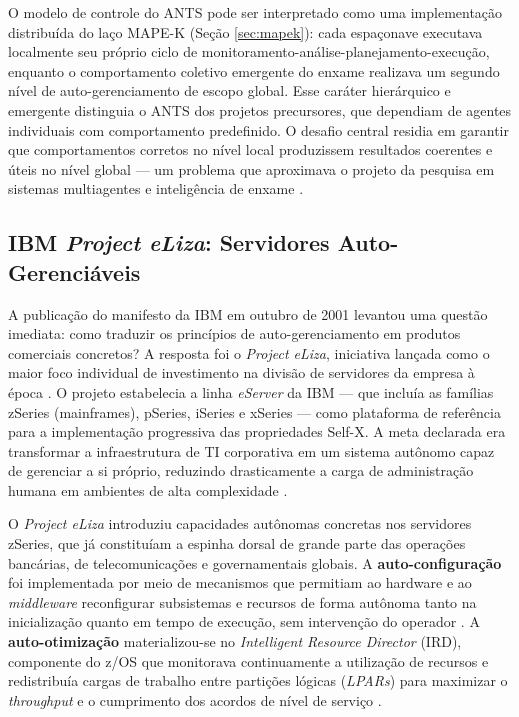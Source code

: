 O modelo de controle do ANTS pode ser interpretado como uma implementação distribuída do laço MAPE-K (Seção \ref{sec:mapek}): cada espaçonave executava localmente seu próprio ciclo de monitoramento-análise-planejamento-execução, enquanto o comportamento coletivo emergente do enxame realizava um segundo nível de auto-gerenciamento de escopo global. Esse caráter hierárquico e emergente distinguia o ANTS dos projetos precursores, que dependiam de agentes individuais com comportamento predefinido. O desafio central residia em garantir que comportamentos corretos no nível local produzissem resultados coerentes e úteis no nível global --- um problema que aproximava o projeto da pesquisa em sistemas multiagentes e inteligência de enxame \cite{truszkowski2004}.

\subsection{IBM \textit{Project eLiza}: Servidores Auto-Gerenciáveis}

A publicação do manifesto da IBM em outubro de 2001 levantou uma questão imediata: como traduzir os princípios de auto-gerenciamento em produtos comerciais concretos? A resposta foi o \textit{Project eLiza}, iniciativa lançada como o maior foco individual de investimento na divisão de servidores da empresa à época \cite{ganek2003}. O projeto estabelecia a linha \textit{eServer} da IBM --- que incluía as famílias zSeries (mainframes), pSeries, iSeries e xSeries --- como plataforma de referência para a implementação progressiva das propriedades Self-X. A meta declarada era transformar a infraestrutura de TI corporativa em um sistema autônomo capaz de gerenciar a si próprio, reduzindo drasticamente a carga de administração humana em ambientes de alta complexidade \cite{ibm2001, ganek2003}.

O \textit{Project eLiza} introduziu capacidades autônomas concretas nos servidores zSeries, que já constituíam a espinha dorsal de grande parte das operações bancárias, de telecomunicações e governamentais globais. A \textbf{auto-configuração} foi implementada por meio de mecanismos que permitiam ao hardware e ao \textit{middleware} reconfigurar subsistemas e recursos de forma autônoma tanto na inicialização quanto em tempo de execução, sem intervenção do operador \cite{ganek2003}. A \textbf{auto-otimização} materializou-se no \textit{Intelligent Resource Director} (IRD), componente do z/OS que monitorava continuamente a utilização de recursos e redistribuía cargas de trabalho entre partições lógicas (\textit{LPARs}) para maximizar o \textit{throughput} e o cumprimento dos acordos de nível de serviço \cite{ganek2003}.

